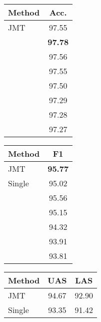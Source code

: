 \documentclass[11pt,a4paper]{article}
\begin{document}
\begin{table*}[t!]
\begin{minipage}[t]{.32\textwidth}
  \begin{center}
{\scriptsize
	\begin{tabular}{l|c}
    Method   & Acc.  \\ \hline
	JMT &  97.55  \\ \hline
	\citet{ling2015charlstm} &  {\bf 97.78}  \\
	\citet{kumar2016dmn} &        97.56 \\
    \citet{ma2016seqlabel} & 97.55 \\
    \citet{sogaard2011pos} & 97.50 \\
    \citet{collobert2011senna} & 97.29 \\
    \citet{tsuruoka2011} & 97.28 \\
    \citet{toutanova2003pos} & 97.27 \\ \hline
  \end{tabular}
}
    \caption{POS tagging results.}
    \label{table:pos}
  \end{center}
\end{minipage}
\begin{minipage}[t]{.32\textwidth}
  \begin{center}
{\scriptsize
	\begin{tabular}{l|c}
    Method   & F1  \\ \hline
	JMT &  {\bf 95.77}  \\
   	Single				 &  95.02  \\ \hline
	\citet{sogaard2016} &  95.56  \\
	\citet{suzuki2008chunk} & 95.15 \\
    \citet{collobert2011senna} & 94.32 \\
    \citet{kudo2001chunk} & 93.91 \\
    \citet{tsuruoka2011} & 93.81 \\ \hline
  \end{tabular}
}
    \caption{Chunking results.}
    \label{table:chunk}
  \end{center}
\end{minipage}
\begin{minipage}[t]{.35\textwidth}
  \begin{center}
{\scriptsize
	\begin{tabular}{l|cc}
    Method   & UAS  & LAS  \\ \hline
	JMT &  94.67 & 92.90 \\
    Single & 93.35 & 91.42 \\ \hline

\end{tabular}}
\end{center}
\end{minipage}
\end{table*}
\end{document}
